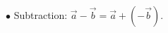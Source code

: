 \documentclass[preview]{standalone}
\begin{document}
\begin{center}
$\bullet$ Subtraction: \(\vec a-\vec b=\vec a+(-\vec b)\).
\end{center}
\end{document}
